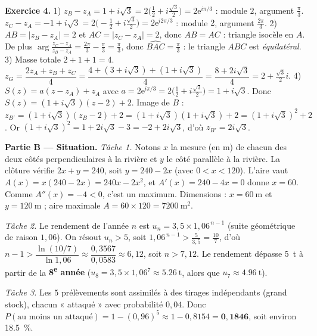 \noindent\textbf{Exercice 4.}
1) $z_B-z_A=1+i\sqrt3=2\big(\tfrac12+i\tfrac{\sqrt3}2\big)=2\mathrm e^{i\pi/3}$ : module $2$, argument $\frac\pi3$.
$z_C-z_A=-1+i\sqrt3=2\big(-\tfrac12+i\tfrac{\sqrt3}2\big)=2\mathrm e^{i2\pi/3}$ : module $2$, argument $\frac{2\pi}3$.
2) $AB=|z_B-z_A|=2$ et $AC=|z_C-z_A|=2$, donc $AB=AC$ : triangle isocèle en $A$. De plus
$\arg\frac{z_C-z_A}{z_B-z_A}=\frac{2\pi}3-\frac\pi3=\frac\pi3$, donc $\widehat{BAC}=\frac\pi3$ :
le triangle $ABC$ est \emph{équilatéral}.
3) Masse totale $2+1+1=4$. $z_G=\dfrac{2z_A+z_B+z_C}{4}=\dfrac{4+(3+i\sqrt3)+(1+i\sqrt3)}{4}=\dfrac{8+2i\sqrt3}{4}=2+\tfrac{\sqrt3}2 i$.
4) $S(z)=a(z-z_A)+z_A$ avec $a=2\mathrm e^{i\pi/3}=2\big(\tfrac12+i\tfrac{\sqrt3}2\big)=1+i\sqrt3$.
Donc $S(z)=(1+i\sqrt3)(z-2)+2$. Image de $B$ :
$z_{B'}=(1+i\sqrt3)(z_B-2)+2=(1+i\sqrt3)(1+i\sqrt3)+2=(1+i\sqrt3)^2+2$.
Or $(1+i\sqrt3)^2=1+2i\sqrt3-3=-2+2i\sqrt3$, d'où $z_{B'}=2i\sqrt3$.

\smallskip
\noindent\textbf{Partie B — Situation.}
\emph{Tâche 1.} Notons $x$ la mesure (en m) de chacun des deux côtés perpendiculaires à la
rivière et $y$ le côté parallèle à la rivière. La clôture vérifie $2x+y=240$, soit
$y=240-2x$ (avec $0<x<120$). L'aire vaut $A(x)=x(240-2x)=240x-2x^2$, et
$A'(x)=240-4x=0$ donne $x=60$. Comme $A''(x)=-4<0$, c'est un maximum. Dimensions :
$x=\SI{60}{\metre}$ et $y=\SI{120}{\metre}$ ; aire maximale $A=60\times120=\SI{7200}{\metre\squared}$.

\emph{Tâche 2.} Le rendement de l'année $n$ est $u_n=3{,}5\times1{,}06^{\,n-1}$ (suite
géométrique de raison $1{,}06$). On résout $u_n>5$, soit $1{,}06^{\,n-1}>\frac{5}{3{,}5}=\frac{10}{7}$,
d'où $n-1>\dfrac{\ln(10/7)}{\ln1{,}06}\approx\dfrac{0{,}3567}{0{,}0583}\approx6{,}12$, soit $n>7{,}12$.
Le rendement dépasse \SI{5}{\tonne} à partir de la \textbf{8\textsuperscript{e} année}
($u_8=3{,}5\times1{,}06^{7}\approx\SI{5,26}{\tonne}$, alors que $u_7\approx\SI{4,96}{\tonne}$).

\emph{Tâche 3.} Les $5$ prélèvements sont assimilés à des tirages indépendants (grand stock),
chacun « attaqué » avec probabilité $0{,}04$. Donc
$P(\text{au moins un attaqué})=1-(0{,}96)^5\approx1-0{,}8154=\mathbf{0{,}1846}$, soit environ \SI{18,5}{\percent}.
